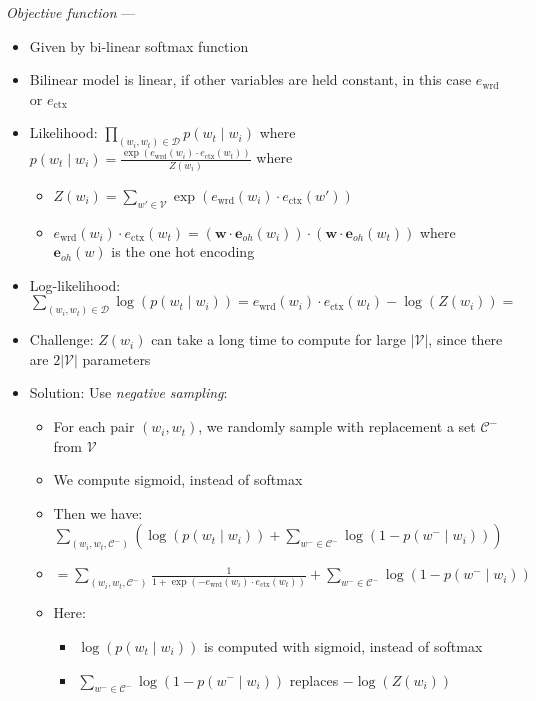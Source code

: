 \emph{Objective function} --- 
\begin{itemize}
    \item Given by bi-linear softmax function
    \item Bilinear model is linear, if other variables are held constant, in this case $e_\textrm{wrd}$ or $e_\textrm{ctx}$
    \item Likelihood:
    $
    \prod_{(w_i, w_t) \in \mathcal{D}} p(w_t \mid w_i)
    $ where\\
    $
    p(w_t \mid w_i) = \frac{\exp\left(e_\textrm{wrd}(w_i) \cdot e_\textrm{ctx}(w_t)\right)}{Z(w_i)}
    $ where
    \begin{itemize}
        \item $
        Z(w_i) = \sum_{w' \in \mathcal{V}} \exp\left(e_\textrm{wrd}(w_i) \cdot e_\textrm{ctx}(w')\right)
        $
        \item $
        e_\textrm{wrd}(w_i) \cdot e_\textrm{ctx}(w_t) = (\boldsymbol{w} \cdot \boldsymbol{e}_{oh}(w_i)) \cdot (\boldsymbol{w} \cdot \boldsymbol{e}_{oh}(w_t))
        $ where $\boldsymbol{e}_{oh}(w)$ is the one hot encoding
    \end{itemize}
    \item Log-likelihood: $\sum_{(w_i, w_t) \in \mathcal{D}} \log\left(p(w_t \mid w_i)\right) = e_\textrm{wrd}(w_i) \cdot e_\textrm{ctx}(w_t) - \log(Z(w_i)) = $
    \item Challenge: $Z(w_i)$ can take a long time to compute for large $|\mathcal{V}|$, since there are $2|\mathcal{V}|$ parameters
    \item Solution: Use \emph{negative sampling}:
    \begin{itemize}
        \item For each pair $(w_i, w_t)$, we randomly sample with replacement a set $\mathcal{C}^-$ from $\mathcal{V}$
        \item We compute sigmoid, instead of softmax
        \item Then we have:
        $
        \sum_{(w_i, w_t, \mathcal{C}^-)} \left( \log(p(w_t \mid w_i)) + \sum_{w^- \in \mathcal{C}^-} \log(1 - p(w^- \mid w_i)) \right)
        $
        \item $
        = \sum_{(w_i, w_t, \mathcal{C}^-)} \frac{1}{1 + \exp\left(-e_\textrm{wrd}(w_i) \cdot e_\textrm{ctx}(w_t)\right)} + \sum_{w^- \in \mathcal{C}^-} \log(1 - p(w^- \mid w_i))
        $
        \item Here:
        \begin{itemize}
            \item $\log(p(w_t \mid w_i))$ is computed with sigmoid, instead of softmax
            \item $\sum_{w^- \in \mathcal{C}^-} \log(1 - p(w^- \mid w_i))$ replaces $- \log(Z(w_i))$
        \end{itemize}
    \end{itemize}
\end{itemize}

